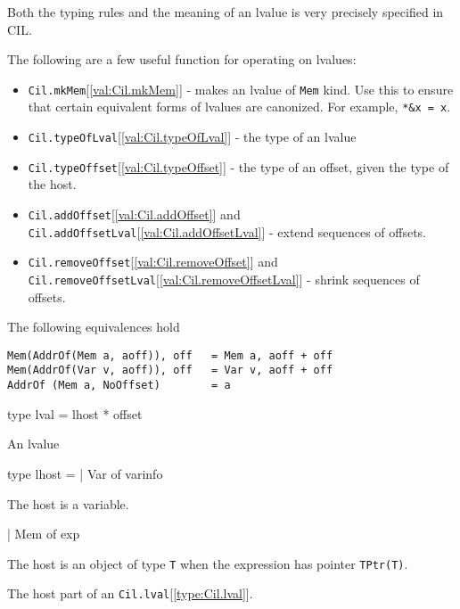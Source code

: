 \documentclass[11pt]{article}
\begin{document}
 Both the typing rules and the meaning of an lvalue is very precisely
specified in CIL. 


 The following are a few useful function for operating on lvalues:\begin{itemize}
\item {\tt{Cil.mkMem}}[\ref{val:Cil.mkMem}] - makes an lvalue of {\tt{Mem}} kind. Use this to ensure
that certain equivalent forms of lvalues are canonized. 
For example, {\tt{*\&x = x}}. 
\item {\tt{Cil.typeOfLval}}[\ref{val:Cil.typeOfLval}] - the type of an lvalue
\item {\tt{Cil.typeOffset}}[\ref{val:Cil.typeOffset}] - the type of an offset, given the type of the
host. 
\item {\tt{Cil.addOffset}}[\ref{val:Cil.addOffset}] and {\tt{Cil.addOffsetLval}}[\ref{val:Cil.addOffsetLval}] - extend sequences
of offsets.
\item {\tt{Cil.removeOffset}}[\ref{val:Cil.removeOffset}] and {\tt{Cil.removeOffsetLval}}[\ref{val:Cil.removeOffsetLval}] - shrink sequences
of offsets.
\end{itemize}

The following equivalences hold \begin{verbatim}
Mem(AddrOf(Mem a, aoff)), off   = Mem a, aoff + off 
Mem(AddrOf(Var v, aoff)), off   = Var v, aoff + off 
AddrOf (Mem a, NoOffset)        = a                 
\end{verbatim}



\label{type:Cil.lval}\begin{ocamldoccode}
type lval = lhost * offset 
\end{ocamldoccode}
\begin{ocamldocdescription}
An lvalue


\end{ocamldocdescription}




\label{type:Cil.lhost}\begin{ocamldoccode}
type lhost =
  | Var of varinfo
\end{ocamldoccode}
\begin{ocamldoccomment}
The host is a variable.
\end{ocamldoccomment}
\begin{ocamldoccode}
  | Mem of exp
\end{ocamldoccode}
\begin{ocamldoccomment}
The host is an object of type {\tt{T}} when the expression has pointer 
 {\tt{TPtr(T)}}.
\end{ocamldoccomment}
\begin{ocamldocdescription}
The host part of an {\tt{Cil.lval}}[\ref{type:Cil.lval}].


\end{ocamldocdescription}
\end{document}
